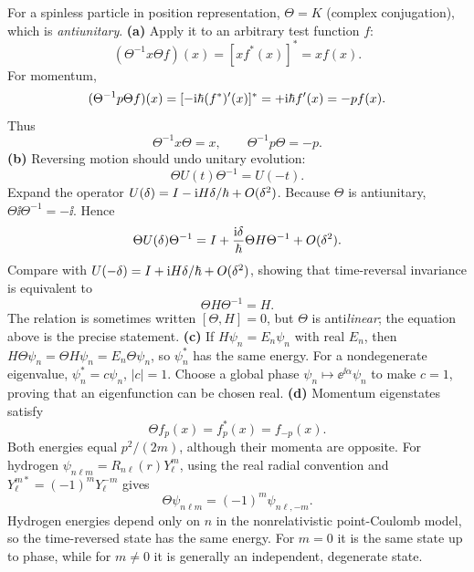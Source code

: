For a spinless particle in
position representation,
$\Theta=K$ (complex conjugation),
which is \emph{antiunitary}.
\textbf{(a)} Apply it to an arbitrary
test function $f$:
\[
(\Theta^{-1}x\Theta f)(x)=
[x f^*(x)]^*=xf(x).
\]
For momentum,
\[
(\Theta^{-1}p\Theta f)(x)
=[-\mathrm i\hbar (f^*)'(x)]^*
=+\mathrm i\hbar f'(x)=-pf(x).
\]
Thus
\begin{equation}
\boxed{\Theta^{-1}x\Theta=x,\qquad
\Theta^{-1}p\Theta=-p.}
\end{equation}
\textbf{(b)} Reversing motion should
undo unitary evolution:
\[
\Theta U(t)\Theta^{-1}=U(-t).
\]
Expand the operator
$U(\delta)=I-\mathrm i H\delta/\hbar+O(\delta^2)$.
Because $\Theta$ is antiunitary,
$\Theta\ii\Theta^{-1}=-\ii$.
Hence
\[
\Theta U(\delta)\Theta^{-1}
=I+\frac{\mathrm i\delta}{\hbar}
\Theta H\Theta^{-1}+O(\delta^2).
\]
Compare with
$U(-\delta)=I+\mathrm i H\delta/\hbar+O(\delta^2)$,
showing that time-reversal invariance is
equivalent to
\begin{equation}
\boxed{\Theta H\Theta^{-1}=H.}
\end{equation}
The relation is sometimes written
$[\Theta,H]=0$, but $\Theta$
is anti\emph{linear}; the equation
above is the precise statement.
\textbf{(c)} If $H\psi_n=E_n\psi_n$
with real $E_n$, then
$H\Theta\psi_n=\Theta H\psi_n
=E_n\Theta\psi_n$, so
$\psi_n^*$ has the same energy.
For a nondegenerate eigenvalue,
$\psi_n^*=c\psi_n$, $|c|=1$.
Choose a global phase
$\psi_n\mapsto\ee^{\ii\alpha}\psi_n$
to make $c=1$, proving that an
eigenfunction can be chosen real.
\textbf{(d)} Momentum eigenstates satisfy
\[
\boxed{\Theta f_p(x)=f_p^*(x)=f_{-p}(x)}.
\]
Both energies equal $p^2/(2m)$,
although their momenta are opposite.
For hydrogen
$\psi_{n\ell m}=R_{n\ell}(r)Y_\ell^m$,
using the real radial convention and
$Y_\ell^{m*}=(-1)^mY_\ell^{-m}$ gives
\begin{equation}
\boxed{\Theta\psi_{n\ell m}
=(-1)^m\psi_{n\ell,-m}.}
\end{equation}
Hydrogen energies depend only
on $n$ in the nonrelativistic
point-Coulomb model, so the
time-reversed state has the same
energy. For $m=0$ it is the same
state up to phase, while for
$m\ne0$ it is generally an
independent, degenerate state.

